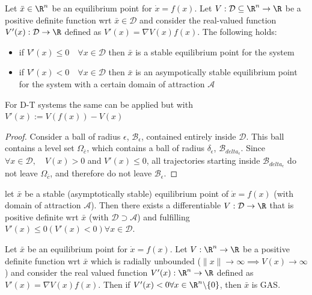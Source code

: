 \documentclass[english]{lectures}
\begin{document}
\begin{theorem}
    Let $\bar{x} \in \R^n$ be an equilibrium point for $\dot{x}=f(x)$. Let $V:\mathcal{D}\subseteq \R^n \to \R$ be a positive definite function wrt $\bar{x}\in\mathcal{D}$ and consider the real-valued function $V'(x):\mathcal{D} \to \R$ defined as $V'(x)=\nabla V(x)f(x)$. The following holds:
    \begin{itemize}
        \item if $V'(x)\leq 0 \quad \forall x\in\mathcal{D}$ then $\bar{x}$ is a stable equilibrium point for the system
        \item if $V'(x)< 0 \quad \forall x\in\mathcal{D}$ then $\bar{x}$ is an asympotically stable equilibrium point for the system with a certain domain of attraction $\mathcal{A}$
    \end{itemize}
    For D-T systems the same can be applied but with $V'(x):=V(f(x))-V(x)$
\end{theorem}
\begin{proof}
    Consider a ball of radius $\epsilon$, $\mathcal{B}_{\epsilon}$, contained entirely inside $\mathcal{D}$. This ball contains a level set $\Omega_{\bar{c}}$, which contains a ball of radius $\delta_{\epsilon}$, $\mathcal{B}_{delta_{\epsilon}}$. Since $\forall x \in \mathcal{D},\quad V(x)>0$ and $V'(x)\leq 0$, all trajectories starting inside $\mathcal{B}_{delta_{\epsilon}}$ do not leave $\Omega_{\bar{c}}$, and therefore do not leave $\mathcal{B}_{\epsilon}$.
\end{proof}
\begin{theorem}
    let $\bar{x}$ be a stable (asymptotically stable) equilibrium point of $\dot{x}=f(x)$ (with domain of attraction $\mathcal{A}$). Then there exists a differentiable $V:\mathcal{D} \to \R$ that is positive definite wrt $\bar{x}$ (with $\mathcal{D} \supset \mathcal{A}$) and fulfilling $V'(x)\leq 0 (V'(x)<0) \forall x \in \mathcal{D}$. 
\end{theorem}

\begin{theorem}
    Let $\bar{x}$ be an equilibrium point for $\dot{x}=f(x)$. Let $V:\R^n\to \R$ be a positive definite function wrt $\bar{x}$ which is radially unbounded ($\|x\|\to\infty\implies V(x)\to\infty$) and consider the real valued function $V'(x):\R^n\to\R$ defined as $V'(x)=\nabla V(x)f(x)$. Then if $V'(x)<0\forall x \in\R^n\backslash\{0\}$, then $\bar{x}$ is GAS.
\end{theorem}
\end{document}
